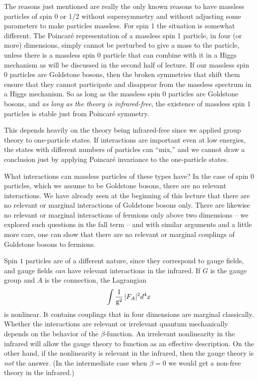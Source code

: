 The reasons just mentioned are really the only known reasons to have
massless particles of spin 0 or 1/2 without supersymmetry and without
adjusting some parameters to make particles massless.  For spin 1 the
situation is somewhat different.
The Poincar\'e representation
of a  massless spin 1 particle, in four (or more) dimensions, simply cannot
be perturbed to give a mass to the particle, unless there is 
a massless spin 0 particle that can combine with it in a Higgs mechanism
as will be discussed in the second half of
lecture.  If our massless spin 0 particles
are Goldstone bosons, then the broken symmetries that shift  them
ensure that they cannot participate and disappear from the massless spectrum
in a Higgs mechanism.  So as long as the massless spin 0 particles
are Goldstone bosons, and {\it as long as the theory is infrared-free},
the existence of massless spin 1 particles is stable just from Poincar\'e
symmetry.

This
 depends heavily on the theory being infrared-free
since we applied group theory to one-particle states.  If interactions
are important even at low energies, the states with different numbers of
particles can ``mix,'' and we cannot draw a conclusion just by applying
Poincar\'e invariance to the one-particle states.

What interactions can massless particles of these types have?
In the case of spin $0$ particles, which we assume to be Goldstone bosons,
there are no relevant interactions.   We have already seen at the beginning
of this lecture that there are no relevant or marginal
interactions of Goldstone
bosons only.  There are likewise no relevant or marginal 
interactions of fermions
only above two dimensions -- we explored such questions in the fall term --
and with similar arguments and a little more care, one can show that
there are no relevant or marginal couplings of Goldstone bosons to
fermions.



Spin $1$ particles are of a different nature, since they correspond to
gauge fields, and gauge fields {\it can}\/ have relevant interactions in
the infrared.  If $G$ is the gauge group and $A$ is the connection, the
Lagrangian
$$\int\frac1{\text{g}^2}\,|F_A|^2d^4x$$ is nonlinear.
It contains couplings that in four dimensions
are marginal classically. Whether the interactions
are  relevant or
irrelevant quantum mechanically
depends on the behavior of the $\beta$-function.  An irrelevant
nonlinearity in the infrared will allow the gauge theory to function as an
effective description.  On the other hand, if the nonlinearity is relevant
in the infrared, then the gauge theory is {\it not}\/ the answer.  (In the
intermediate case when $\beta=0$ we would get a non-free theory in the
infrared.)


